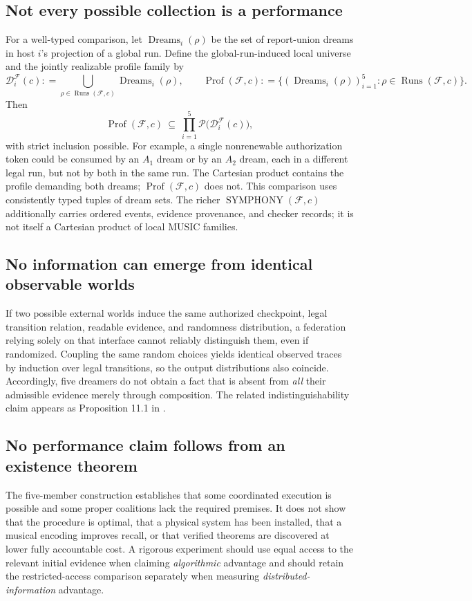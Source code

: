 \documentclass[11pt,letterpaper]{article}
\theoremstyle{definition}
\theoremstyle{remark}
\newcommand{\PSet}{\mathcal{P}}
\newcommand{\Runs}{\operatorname{Runs}}
\newcommand{\Dream}{\mathcal{D}}
\newcommand{\Sym}{\operatorname{SYMPHONY}}
\newcommand{\defeq}{\mathrel{\mathop:}=}
\begin{document}
\subsection{Not every possible collection is a performance}
For a well-typed comparison, let $\operatorname{Dreams}_i(\rho)$ be the set of report-union dreams in host $i$'s projection of a global run. Define the global-run-induced local universe and the jointly realizable profile family by
\[
\Dream_i^{\mathcal F}(c)\defeq
 \bigcup_{\rho\in\Runs(\mathcal F,c)}\operatorname{Dreams}_i(\rho),\qquad
 \operatorname{Prof}(\mathcal F,c)\defeq
 \bigl\{(\operatorname{Dreams}_i(\rho))_{i=1}^{5}:\rho\in\Runs(\mathcal F,c)\bigr\}.
\]
Then
\[
\operatorname{Prof}(\mathcal F,c)\ \subseteq\
\prod_{i=1}^{5}\PSet\bigl(\Dream_i^{\mathcal F}(c)\bigr),
\]
with strict inclusion possible. For example, a single nonrenewable authorization token could be consumed by an $A_1$ dream or by an $A_2$ dream, each in a different legal run, but not by both in the same run. The Cartesian product contains the profile demanding both dreams; $\operatorname{Prof}(\mathcal F,c)$ does not. This comparison uses consistently typed tuples of dream sets. The richer $\Sym(\mathcal F,c)$ additionally carries ordered events, evidence provenance, and checker records; it is not itself a Cartesian product of local MUSIC families.

\subsection{No information can emerge from identical observable worlds}
If two possible external worlds induce the same authorized checkpoint, legal transition relation, readable evidence, and randomness distribution, a federation relying solely on that interface cannot reliably distinguish them, even if randomized. Coupling the same random choices yields identical observed traces by induction over legal transitions, so the output distributions also coincide. Accordingly, five dreamers do not obtain a fact that is absent from \emph{all} their admissible evidence merely through composition. The related indistinguishability claim appears as Proposition 11.1 in \cite{tenneson-dreaming}.

\subsection{No performance claim follows from an existence theorem}
The five-member construction establishes that some coordinated execution is possible and some proper coalitions lack the required premises. It does not show that the procedure is optimal, that a physical system has been installed, that a musical encoding improves recall, or that verified theorems are discovered at lower fully accountable cost. A rigorous experiment should use equal access to the relevant initial evidence when claiming \emph{algorithmic} advantage and should retain the restricted-access comparison separately when measuring \emph{distributed-information} advantage.
\end{document}
